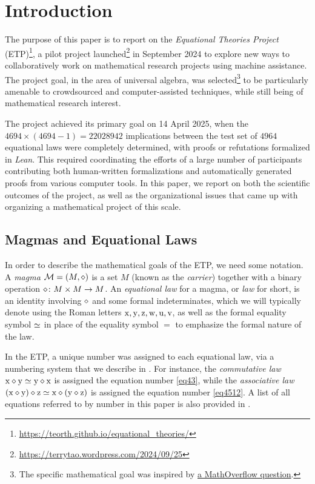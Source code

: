 \section{Introduction}

The purpose of this paper is to report on the \emph{Equational Theories Project} (ETP)\footnote{\url{https://teorth.github.io/equational_theories/}}, a pilot project launched\footnote{\url{https://terrytao.wordpress.com/2024/09/25}} in September 2024 to explore new ways to collaboratively work on mathematical research projects using machine assistance. The project goal, in the area of universal algebra, was selected\footnote{The specific mathematical goal was inspired by \href{https://mathoverflow.net/questions/450930}{a MathOverflow question}.} to be particularly amenable to crowdsourced and computer-assisted techniques, while still being of mathematical research interest.

The project achieved its primary goal on 14 April 2025, when the $\num{4694} \times (\num{4694}-1) = \num{22028942}$ implications between the test set of $\num{4964}$ equational laws were completely determined, with proofs or refutations formalized in \emph{Lean}.  This required coordinating the efforts of a large number of participants contributing both human-written formalizations and automatically generated proofs from various computer tools.  In this paper, we report on both the scientific outcomes of the project, as well as the organizational issues that came up with organizing a mathematical project of this scale.

\subsection{Magmas and Equational Laws}

In order to describe the mathematical goals of the ETP, we need some notation. A \emph{magma} ${\mathcal{M}} = (M,\diamond)$ is a set $M$ (known as the \emph{carrier}) together with a binary operation $\diamond \colon M \times M \to M$. An \emph{equational law} for a magma, or \emph{law} for short, is an identity involving $\diamond$ and some formal indeterminates, which we will typically denote using the Roman letters $\mathrm{x},\mathrm{y},\mathrm{z},\mathrm{w},\mathrm{u},\mathrm{v}$, as well as the formal equality symbol $\simeq$ in place of the equality symbol $=$ to emphasize the formal nature of the law.

In the ETP, a unique number was assigned to each equational law, via a numbering system that we describe in .  For instance, the \emph{commutative law} $\mathrm{x} \diamond \mathrm{y} \simeq \mathrm{y} \diamond \mathrm{x}$ is assigned the equation number \eqref{eq43}, while the \emph{associative law} $(\mathrm{x} \diamond \mathrm{y}) \diamond \mathrm{z} \simeq \mathrm{x} \diamond (\mathrm{y} \diamond \mathrm{z})$ is assigned the equation number \eqref{eq4512}.  A list of all equations referred to by number in this paper is also provided in .

